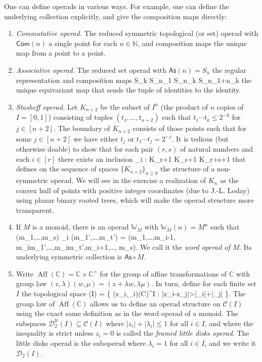 \documentclass[fleqn, a4paper, twoside]{article}
\makeatletter
\newcommand{\0}{\langle 0\rangle}
\newenvironment{tenumerate}{
 \begin{enumerate}
  \setlength{\itemsep}{0pt}
  \setlength{\parskip}{0pt}
}{\end{enumerate}}
\let\[\@undefined
\DeclareRobustCommand{\[}{\begin{equation}}%
\let\]\@undefined
\DeclareRobustCommand{\]}{\end{equation}}%
\theoremstyle{mytheorem}
\theoremstyle{introthm}
\theoremstyle{mydefinition}
\theoremstyle{mydefinition2}
\theoremstyle{plain} %
\newcommand{\?}{\,?\,}
\newcommand{\NN}{\mathbb N}
\theoremstyle{mytheorem}
\theoremstyle{plain} %
\makeatother
\begin{document}
One can define operads in various ways. For example,
one can define the underlying collection explicitly,
and give the composition maps directly:
\begin{tenumerate}
\item \emph{Commutative operad.} The reduced symmetric topological (or set)
operad with $\mathsf{Com}(n)$ a single point for each
$n\in \NN$, and composition maps the unique
map from a point to a point.
\item \emph{Associative operad.} 
The reduced set operad with
$\mathsf{As}(n) = S_n$
the regular representation and composition maps
\[ S_k \times S_{n_1} \times
\cdots \times S_{n_k} \longrightarrow S_{n_1+\cdots n_k} \]
the unique equivariant map that sends the tuple
of identities to the identity.
\item  \emph{Stasheff operad.}
Let $K_{n+2}$ be the subset of $I^n$ (the
product of $n$ copies of $I=[0,1]$) 
consisting of tuples $(t_1,\ldots,t_{n+2})$
such that $t_1\cdots t_k\leqslant 2^{-k}$
for $j\in [n+2]$. The boundary of 
$K_{n+2}$ consists of those points such
that for some $j\in [n+2]$ we have
either $t_j$ or $t_1\cdots t_j = 2^{-j}$.
It is tedious (but otherwise doable)
to show that for each pair $(r,s)$ of
natural numbers and each $i\in [r]$
there exists an inclusion
\[ \circ_i : K_{r+1} \times K_{s+1} \longrightarrow
 	K_{r+s+1} \] 
that defines on the sequence of
spaces $\{K_{n+2}\}_{n\geqslant 0}$
the structure of a non-symmetric operad.
We will see in the exercise a realization
of $K_n$ as the convex hull of points
with positive integer coordinates
(due to J.-L. Loday)  using planar
binary rooted trees, which will make the
operad structure more transparent.

\item If $M$ is a monoid, there is an
operad $\mathbb W_M$ with $\mathbb{W}_M(n) =
M^n$ such that 
\[(m_1,\ldots,m_s) \circ_i (m_1',\ldots,m_t') = 
 	(m_1,\ldots,m_{i-1}, m_im_1',\ldots,m_im_t',m_{i+1},\ldots, m_s).\] We call it the
 \emph{word operad of $M$}. Its underlying
 symmetric collection is $\mathsf{As}\circ M$. 
 
 \item Write $\operatorname{Aff}(\mathbb C) = \mathbb{C}\times \mathbb{C}^\times$ for the group of affine transformations of
$\mathbb C$ with group law $(z,\lambda)(w,\mu) = (z+\lambda w,\lambda\mu)$. In turn, define for each finite set $I$ the topological space
\[ (I) = \{ (z_i,\lambda_i)\in {}(\mathbb C)^I  : |z_i-z_j|>|\lambda_i|+|\lambda_j| \}.\] 
The group law of $\operatorname{Aff}(\mathbb C)$ allows us to
define an operad structure on $\mathcal{C}(I)$ using the
exact same definition as in the word operad of a monoid. 
The subspaces $\mathcal{D}_2^{\mathrm{fr}}(I)
	\subseteq \mathcal{C}(I)$
where $|z_i|+|\lambda_i|\leqslant 1$ for all $i\in I$, and 
where the inequality is strict unless $z_i=0$ is called
the \emph{framed little disks operad}. The little disks operad
is the suboperad where $\lambda_i = 1$ for all $i\in I$, and 
we write it $\mathcal{D}_2(I)$.


\end{tenumerate}
\end{document}
